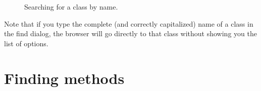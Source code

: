 \documentclass[a4paper,10pt,twoside]{book}
\begin{document}
\begin{figure}[hbt]
\centerline{
}
\caption{Searching for a class by name.
\label{fig:findit}}
\end{figure}

Note that if you type the complete (and correctly capitalized) name of a class in the find dialog, the browser will go directly to that class without showing you the list of options.

\section{Finding methods}
\label{sec:quick:methodFinder}
\end{document}
